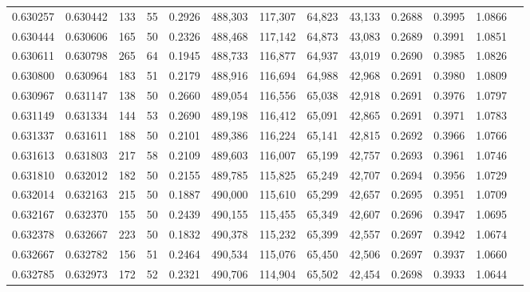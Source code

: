 \begin{tabular}{rrrrrrrrrrrrr}
0.630257 & 0.630442 &   133 &  55 &                                     0.2926 & 488,303 & 117,307 &  64,823 &  43,133 & 0.2688 & 0.3995 & 1.0866 \\
0.630444 & 0.630606 &   165 &  50 &                                     0.2326 & 488,468 & 117,142 &  64,873 &  43,083 & 0.2689 & 0.3991 & 1.0851 \\
0.630611 & 0.630798 &   265 &  64 &                                     0.1945 & 488,733 & 116,877 &  64,937 &  43,019 & 0.2690 & 0.3985 & 1.0826 \\
0.630800 & 0.630964 &   183 &  51 &                                     0.2179 & 488,916 & 116,694 &  64,988 &  42,968 & 0.2691 & 0.3980 & 1.0809 \\
0.630967 & 0.631147 &   138 &  50 &                                     0.2660 & 489,054 & 116,556 &  65,038 &  42,918 & 0.2691 & 0.3976 & 1.0797 \\
0.631149 & 0.631334 &   144 &  53 &                                     0.2690 & 489,198 & 116,412 &  65,091 &  42,865 & 0.2691 & 0.3971 & 1.0783 \\
0.631337 & 0.631611 &   188 &  50 &                                     0.2101 & 489,386 & 116,224 &  65,141 &  42,815 & 0.2692 & 0.3966 & 1.0766 \\
0.631613 & 0.631803 &   217 &  58 &                                     0.2109 & 489,603 & 116,007 &  65,199 &  42,757 & 0.2693 & 0.3961 & 1.0746 \\
0.631810 & 0.632012 &   182 &  50 &                                     0.2155 & 489,785 & 115,825 &  65,249 &  42,707 & 0.2694 & 0.3956 & 1.0729 \\
0.632014 & 0.632163 &   215 &  50 &                                     0.1887 & 490,000 & 115,610 &  65,299 &  42,657 & 0.2695 & 0.3951 & 1.0709 \\
0.632167 & 0.632370 &   155 &  50 &                                     0.2439 & 490,155 & 115,455 &  65,349 &  42,607 & 0.2696 & 0.3947 & 1.0695 \\
0.632378 & 0.632667 &   223 &  50 &                                     0.1832 & 490,378 & 115,232 &  65,399 &  42,557 & 0.2697 & 0.3942 & 1.0674 \\
0.632667 & 0.632782 &   156 &  51 &                                     0.2464 & 490,534 & 115,076 &  65,450 &  42,506 & 0.2697 & 0.3937 & 1.0660 \\
0.632785 & 0.632973 &   172 &  52 &                                     0.2321 & 490,706 & 114,904 &  65,502 &  42,454 & 0.2698 & 0.3933 & 1.0644 \\

\end{tabular}

